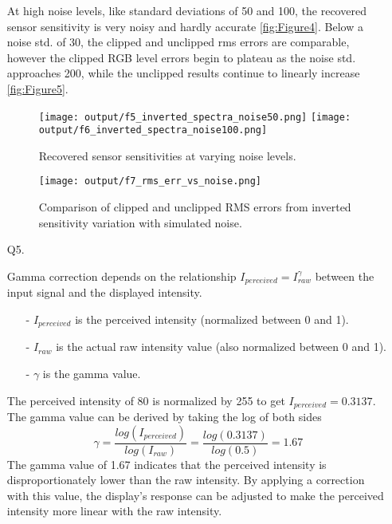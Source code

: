 \documentclass[12pt]{report}
\begin{document}
\begin{enumerate}
    At high noise levels, like standard deviations of 50 and 100, the recovered sensor sensitivity is very noisy and hardly 
    accurate \autoref{fig:Figure4}. Below a noise std. of 30, the clipped and unclipped rms errors are comparable, 
    however the clipped RGB level errors begin to plateau as the noise std. approaches 200, while the unclipped results 
    continue to linearly increase \autoref{fig:Figure5}. 

    \begin{figure}[ht!]
        \centering
        \texttt{[image: output/f5\_inverted\_spectra\_noise50.png]} \vfill \null 
        \texttt{[image: output/f6\_inverted\_spectra\_noise100.png]}
        \caption{Recovered sensor sensitivities at varying noise levels.}
        \label{fig:Figure4}
    \end{figure}

    \begin{figure}[ht!]
        \centering
        \texttt{[image: output/f7\_rms\_err\_vs\_noise.png]}
        \caption{Comparison of clipped and unclipped RMS errors from inverted sensitivity variation with simulated noise.}
        \label{fig:Figure5}
    \end{figure}

    \FloatBarrier

    \item[Q5.] 

    Gamma correction depends on the relationship $I_{perceived} = I_{raw}^{\gamma}$ between the input signal and the 
    displayed intensity. 

    \begin{itemize}
        \item[-] $I_{perceived}$ is the perceived intensity (normalized between 0 and 1).
        \item[-] $I_{raw}$ is the actual raw intensity value (also normalized between 0 and 1).
        \item[-] $\gamma$ is the gamma value.
    \end{itemize}

    The perceived intensity of 80 is normalized by 255 to get $I_{perceived} = 0.3137$. The gamma value can be derived 
    by taking the log of both sides 
    $$
    \gamma = \frac {log(I_{perceived})} {{log(I_{raw})}} = \frac {log(0.3137)} {{log(0.5)}} = 1.67
    $$
    The gamma value of 1.67 indicates that the perceived intensity is disproportionately lower than the raw intensity.
    By applying a  correction with this value, the display's response can be adjusted to make the perceived intensity 
    more linear with the raw intensity.


\end{enumerate}
\end{document}
